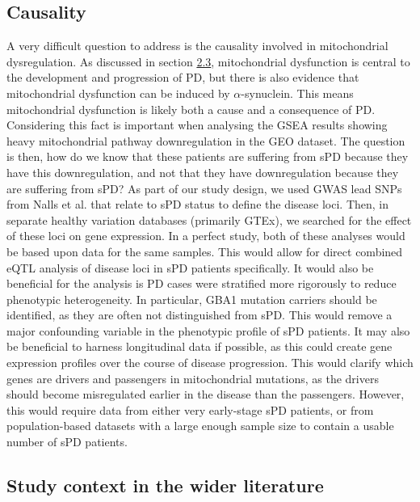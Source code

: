 \documentclass{article}
\begin{document}
\subsection{Causality}
\label{subsubsec:causality}
A very difficult question to address is the causality involved in mitochondrial dysregulation. As discussed in section \hyperref[subsubsec:mitochondria]{2.3}, mitochondrial dysfunction is central to the development and progression of PD\cite{Bartman2024MitochondrialDiseases}\cite{MoradiVastegani2023MitochondrialStrategies}, but there is also evidence that mitochondrial dysfunction can be induced by $\alpha$-synuclein\cite{Sohrabi2023CommonDisease.}. This means mitochondrial dysfunction is likely both a cause and a consequence of PD. Considering this fact is important when analysing the GSEA results showing heavy mitochondrial pathway downregulation in the GEO dataset. The question is then, how do we know that these patients are suffering from sPD because they have this downregulation, and not that they have downregulation because they are suffering from sPD? As part of our study design, we used GWAS lead SNPs from Nalls et al.\cite{Nalls2019IdentificationStudies} that relate to sPD status to define the disease loci. Then, in separate healthy variation databases (primarily GTEx\cite{Aguet2020TheTissues}), we searched for the effect of these loci on gene expression. In a perfect study, both of these analyses would be based upon data for the same samples. This would allow for direct combined eQTL analysis of disease loci in sPD patients specifically. It would also be beneficial for the analysis is PD cases were stratified more rigorously to reduce phenotypic heterogeneity. In particular, GBA1 mutation carriers should be identified, as they are often not distinguished from sPD\cite{Milenkovic2022GBADisease.}. This would remove a major confounding variable in the phenotypic profile of sPD patients. It may also be beneficial to harness longitudinal data if possible, as this could create gene expression profiles over the course of disease progression. This would clarify which genes are drivers and passengers in mitochondrial mutations, as the drivers should become misregulated earlier in the disease than the passengers. However, this would require data from either very early-stage sPD patients, or from population-based datasets with a large enough sample size to contain a usable number of sPD patients.
\subsection{Study context in the wider literature}
\label{subsec:wider}
\end{document}

